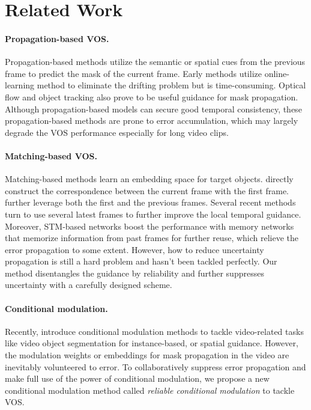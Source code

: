 \documentclass[letterpaper]{article} \usepackage{aaai22}  \usepackage{times}  \usepackage{helvet}  \usepackage{courier}  \usepackage[hyphens]{url}  \usepackage{graphicx} \urlstyle{rm} \def\UrlFont{\rm}  \usepackage{natbib}  \usepackage{caption} \DeclareCaptionStyle{ruled}{labelfont=normalfont,labelsep=colon,strut=off} \frenchspacing  \setlength{\pdfpagewidth}{8.5in}  \setlength{\pdfpageheight}{11in}  \usepackage{algorithm}
\begin{document}
 \section{Related Work}

\paragraph{Propagation-based VOS.}
Propagation-based methods utilize the semantic or spatial cues from the previous frame to predict the mask of the current frame.	
Early methods \cite{perazzi2017learning,caelles2017one,NIPS2017_6c9882bb,khoreva2019lucid} utilize online-learning method to eliminate the drifting problem but is time-consuming. 
Optical flow \cite{tsai2016video,NIPS2017_6c9882bb,cheng2017segflow,xu2018dynamic} and object tracking also prove to be useful guidance for mask propagation.
Although propagation-based models can secure good temporal consistency\cite{caelles2017one}, these propagation-based methods are prone to error accumulation, which may largely degrade the VOS performance especially for long video clips\cite{liang2020video}. 

\paragraph{Matching-based VOS.}
Matching-based methods learn an embedding space for target objects. \cite{chen2018blazingly,hu2018videomatch,zeng2019dmm} directly construct the correspondence between the current frame with the first frame. \cite{lin2019agss,voigtlaender2019feelvos,wang2019ranet,yang2020collaborative} further leverage both the first and the previous frames. Several recent methods \cite{hu2018videomatch,liang2020waternet,duke2021sstvos} turn to use several latest frames to further improve the local temporal guidance. Moreover, STM-based networks \cite{oh2019video,seong2020kernelized,lu2020video,liang2020video,NEURIPS2020_liangVOS,cheng2021modular,wang2021swiftnet,xie2021efficient,hu2021learning,seong2021hierarchical} boost the performance with memory networks that memorize information from past frames for further reuse, which relieve the error propagation to some extent. However, how to reduce uncertainty propagation is still a hard problem and hasn't been tackled perfectly. Our method disentangles the guidance by reliability and further suppresses uncertainty with a carefully designed scheme. 
\paragraph{Conditional modulation.}
Recently, \cite{Yang2018osmn,yang2020collaborative,li2021hybrid} introduce conditional modulation methods to tackle video-related tasks like video object segmentation for instance-based, or spatial guidance. However, the modulation weights or embeddings for mask propagation in the video are inevitably volunteered to error. To collaboratively suppress error propagation and make full use of the power of conditional modulation, we propose a new conditional modulation method called \textit{reliable conditional modulation} to tackle VOS.
 
\end{document}
